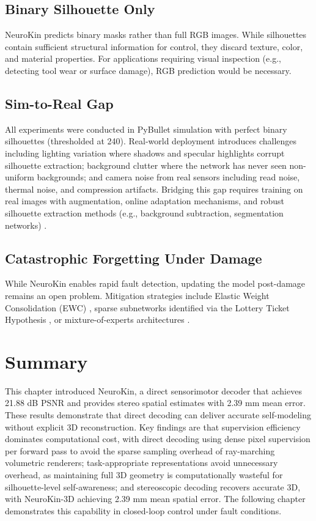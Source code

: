 \documentclass[12pt,a4paper,oneside]{report}
\begin{document}
\subsection{Binary Silhouette Only}

NeuroKin predicts binary masks rather than full RGB images. While silhouettes contain sufficient structural information for control, they discard texture, color, and material properties. For applications requiring visual inspection (e.g., detecting tool wear or surface damage), RGB prediction would be necessary.

\subsection{Sim-to-Real Gap}

All experiments were conducted in PyBullet simulation with perfect binary silhouettes (thresholded at 240). Real-world deployment introduces challenges including lighting variation where shadows and specular highlights corrupt silhouette extraction; background clutter where the network has never seen non-uniform backgrounds; and camera noise from real sensors including read noise, thermal noise, and compression artifacts. Bridging this gap requires training on real images with augmentation, online adaptation mechanisms, and robust silhouette extraction methods (e.g., background subtraction, segmentation networks) \cite{rezvani2024robust, qiu2024swim2real, lim2025splat2real}.

\subsection{Catastrophic Forgetting Under Damage}

While NeuroKin enables rapid fault detection, updating the model post-damage remains an open problem. Mitigation strategies include Elastic Weight Consolidation (EWC) \cite{kirkpatrick2017overcoming}, sparse subnetworks identified via the Lottery Ticket Hypothesis \cite{frankle2018lottery}, or mixture-of-experts architectures \cite{mocanu2018scalable}.

\section{Summary}

This chapter introduced NeuroKin, a direct sensorimotor decoder that achieves 21.88 dB PSNR and provides stereo spatial estimates with 2.39 mm mean error. These results demonstrate that direct decoding can deliver accurate self-modeling without explicit 3D reconstruction. Key findings are that supervision efficiency dominates computational cost, with direct decoding using dense pixel supervision per forward pass to avoid the sparse sampling overhead of ray-marching volumetric renderers; task-appropriate representations avoid unnecessary overhead, as maintaining full 3D geometry is computationally wasteful for silhouette-level self-awareness; and stereoscopic decoding recovers accurate 3D, with NeuroKin-3D achieving 2.39 mm mean spatial error. The following chapter demonstrates this capability in closed-loop control under fault conditions.
\end{document}
